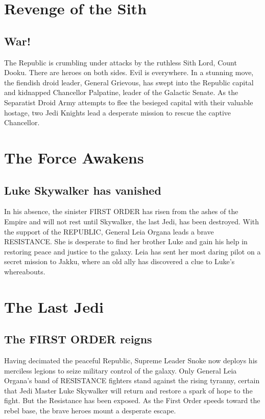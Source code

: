 \documentclass[oneside]{ifgw}
\begin{document}
\lipsum[1-10]



\chapter{Revenge of the Sith}	
\section{War!}
The Republic is crumbling under attacks by the ruthless Sith Lord, Count Dooku. There are heroes on both sides. Evil is everywhere. In a stunning move, the fiendish droid leader, General Grievous, has swept into the Republic capital and kidnapped Chancellor Palpatine, leader of the Galactic Senate. As the Separatist Droid Army attempts to flee the besieged capital with their valuable hostage, two Jedi Knights lead a desperate mission to rescue the captive Chancellor.

\lipsum[1-10]



\chapter{The Force Awakens}
\section{Luke Skywalker has vanished}
In his absence, the sinister FIRST ORDER has risen from the ashes of the Empire and will not rest until Skywalker, the last Jedi, has been destroyed. With the support of the REPUBLIC, General Leia Organa leads a brave RESISTANCE. She is desperate to find her brother Luke and gain his help in restoring peace and justice to the galaxy. Leia has sent her most daring pilot on a secret mission to Jakku, where an old ally has discovered a clue to Luke's whereabouts.

\lipsum[1-10]



\chapter{The Last Jedi}
\section{The FIRST ORDER reigns}
Having decimated the peaceful Republic, Supreme Leader Snoke now deploys his merciless legions to seize military control of the galaxy. Only General Leia Organa's band of RESISTANCE fighters stand against the rising tyranny, certain that Jedi Master Luke Skywalker will return and restore a spark of hope to the fight. But the Resistance has been exposed. As the First Order speeds toward the rebel base, the brave heroes mount a desperate escape.
\end{document}
